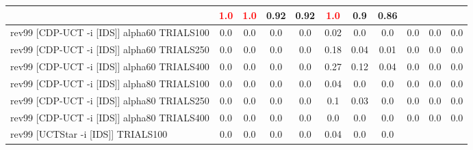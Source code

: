 \documentclass{article}
\begin{document}
\begin{tabular}{|l|r@{$\pm$}rr@{$\pm$}rr@{$\pm$}rr@{$\pm$}rr@{$\pm$}rr@{$\pm$}rr@{$\pm$}rr@{$\pm$}rr@{$\pm$}rr@{$\pm$}r|}
& \multicolumn{2}{c}{\textbf{\textcolor{red}{1.0}}}
& \multicolumn{2}{c}{\textbf{\textcolor{red}{1.0}}}
& \multicolumn{2}{c}{0.92}
& \multicolumn{2}{c}{0.92}
& \multicolumn{2}{c}{\textbf{\textcolor{red}{1.0}}}
& \multicolumn{2}{c}{0.9}
& \multicolumn{2}{c|}{0.86}
\\
\hline
rev99 [CDP-UCT -i [IDS]] alpha60 TRIALS100
& \multicolumn{2}{c}{0.0}
& \multicolumn{2}{c}{0.0}
& \multicolumn{2}{c}{0.0}
& \multicolumn{2}{c}{0.0}
& \multicolumn{2}{c}{0.02}
& \multicolumn{2}{c}{0.0}
& \multicolumn{2}{c}{0.0}
& \multicolumn{2}{c}{0.0}
& \multicolumn{2}{c}{0.0}
& \multicolumn{2}{c|}{0.0}
\\
rev99 [CDP-UCT -i [IDS]] alpha60 TRIALS250
& \multicolumn{2}{c}{0.0}
& \multicolumn{2}{c}{0.0}
& \multicolumn{2}{c}{0.0}
& \multicolumn{2}{c}{0.0}
& \multicolumn{2}{c}{0.18}
& \multicolumn{2}{c}{0.04}
& \multicolumn{2}{c}{0.01}
& \multicolumn{2}{c}{0.0}
& \multicolumn{2}{c}{0.0}
& \multicolumn{2}{c|}{0.0}
\\
rev99 [CDP-UCT -i [IDS]] alpha60 TRIALS400
& \multicolumn{2}{c}{0.0}
& \multicolumn{2}{c}{0.0}
& \multicolumn{2}{c}{0.0}
& \multicolumn{2}{c}{0.0}
& \multicolumn{2}{c}{0.27}
& \multicolumn{2}{c}{0.12}
& \multicolumn{2}{c}{0.04}
& \multicolumn{2}{c}{0.0}
& \multicolumn{2}{c}{0.0}
& \multicolumn{2}{c|}{0.0}
\\
rev99 [CDP-UCT -i [IDS]] alpha80 TRIALS100
& \multicolumn{2}{c}{0.0}
& \multicolumn{2}{c}{0.0}
& \multicolumn{2}{c}{0.0}
& \multicolumn{2}{c}{0.0}
& \multicolumn{2}{c}{0.04}
& \multicolumn{2}{c}{0.0}
& \multicolumn{2}{c}{0.0}
& \multicolumn{2}{c}{0.0}
& \multicolumn{2}{c}{0.0}
& \multicolumn{2}{c|}{0.0}
\\
rev99 [CDP-UCT -i [IDS]] alpha80 TRIALS250
& \multicolumn{2}{c}{0.0}
& \multicolumn{2}{c}{0.0}
& \multicolumn{2}{c}{0.0}
& \multicolumn{2}{c}{0.0}
& \multicolumn{2}{c}{0.1}
& \multicolumn{2}{c}{0.03}
& \multicolumn{2}{c}{0.0}
& \multicolumn{2}{c}{0.0}
& \multicolumn{2}{c}{0.0}
& \multicolumn{2}{c|}{0.0}
\\
rev99 [CDP-UCT -i [IDS]] alpha80 TRIALS400
& \multicolumn{2}{c}{0.0}
& \multicolumn{2}{c}{0.0}
& \multicolumn{2}{c}{0.0}
& \multicolumn{2}{c}{0.0}
& \multicolumn{2}{c}{0.0}
& \multicolumn{2}{c}{0.0}
& \multicolumn{2}{c}{0.0}
& \multicolumn{2}{c}{0.0}
& \multicolumn{2}{c}{0.0}
& \multicolumn{2}{c|}{0.0}
\\
rev99 [UCTStar -i [IDS]] TRIALS100
& \multicolumn{2}{c}{0.0}
& \multicolumn{2}{c}{0.0}
& \multicolumn{2}{c}{0.0}
& \multicolumn{2}{c}{0.0}
& \multicolumn{2}{c}{0.04}
& \multicolumn{2}{c}{0.0}
& \multicolumn{2}{c}{0.0}

\end{tabular}
\end{document}
